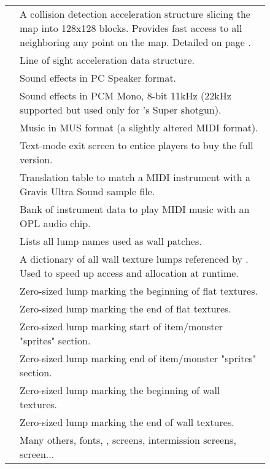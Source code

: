 \begin{figure}[H]
\begin{tabularx}{\textwidth}{ L{0.2}  L{0.8}}
   & A collision detection acceleration structure slicing the map into 128x128 blocks. Provides fast access to all  neighboring any point on the map. Detailed on page \pageref{blockmapdetails}. \\
   &  Line of sight acceleration data structure.\\
  \toprule
   &  Sound effects in PC Speaker format.\\
   &  Sound effects in PCM Mono, 8-bit 11kHz (22kHz supported but used only for \doomii{}'s Super shotgun).\\
   & Music in MUS format (a slightly altered MIDI format).\\
  \toprule
   & Text-mode exit screen to entice players to buy the full version. \\
   & Translation table to match a MIDI instrument with a Gravis Ultra Sound sample file.\\
   &  Bank of instrument data to play MIDI music with an OPL audio chip.\\
   &  Lists all lump names used as wall patches.\\
   &  A dictionary of all wall texture lumps referenced by . Used to speed up access and allocation at runtime.\\  
   &  Zero-sized lump marking the beginning of flat textures.\\  
   &   Zero-sized lump marking the end of flat textures.\\  
   & Zero-sized lump marking start of item/monster "sprites" section. \\  
   & Zero-sized lump marking end of item/monster "sprites" section. \\  
   & Zero-sized lump marking the beginning of wall textures.\\
   & Zero-sized lump marking the end of wall textures.\\
   &  Many others, fonts, ,  screens, intermission screens,  screen... \\  
   \toprule
\end{tabularx}
\end{figure}
\par
\pagebreak






